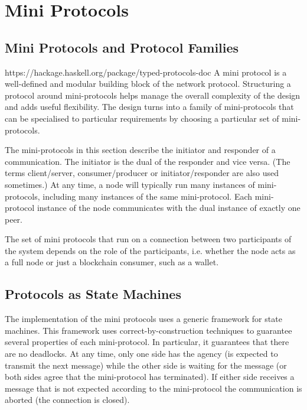 \chapter{Mini Protocols}
\label{chapter:mini-protocols}

\newcommand{\Client}{\textcolor{mygreen}{\textbf{Client}}}
\newcommand{\Server}{\textcolor{myblue}{\textbf{Server}}}

\section{Mini Protocols and Protocol Families}https://hackage.haskell.org/package/typed-protocols-doc
A mini protocol is a well-defined and modular building block of
the network protocol.
Structuring a protocol around mini-protocols helps manage the overall complexity of
the design and adds useful flexibility.
The design turns into a family of mini-protocols that can be specialised to particular requirements
by choosing a particular set of mini-protocols.

The mini-protocols in this section describe the initiator and responder of a communication.
The initiator is the dual of the responder and vice versa.
(The terms client/server, consumer/producer or initiator/responder are also used sometimes.)
At any time, a node will typically run many instances of mini-protocols, including many instances of the
same mini-protocol.
Each mini-protocol instance of the node communicates with the dual instance of
exactly one peer.

The set of mini protocols that run on a connection between two participants of the system
depends on the role of the participants, i.e. whether the node acts as a full node or just
a blockchain consumer, such as a wallet.

\section{Protocols as State Machines}
The implementation of the mini protocols uses a generic framework for state machines.
This framework uses correct-by-construction techniques to guarantee
several properties of each mini-protocol.
In particular, it guarantees that there are no deadlocks.
At any time, only one side has the agency
(is expected to transmit the next message) while the other side is waiting for
the message (or both sides agree that the mini-protocol has terminated).
If either side receives a message that is not expected according to the mini-protocol
the communication is aborted (the connection is closed).

